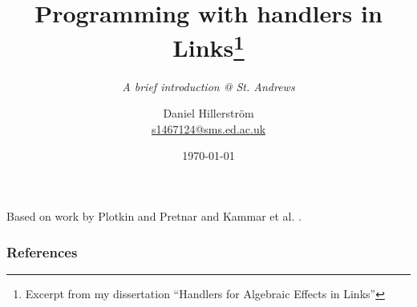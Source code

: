 \documentclass[10pt,compress]{beamer}
\author[Daniel Hillerström]{Daniel Hillerström\\\footnotesize{\href{mailto:s1467124@sms.ed.ac.uk}{s1467124@sms.ed.ac.uk}}}
\title[Programming with handlers in Links]{Programming with handlers in Links\footnote{Excerpt from my dissertation ``Handlers for Algebraic Effects in Links''}}
\subtitle{\textit{A brief introduction @ St. Andrews}}
\institute[University of Edinburgh]{School of Informatics\\The University of Edinburgh}
\date{\today}
\begin{document}
\begin{frame}[plain]
  \maketitle
\begin{center}
Based on work by Plotkin and Pretnar \cite{Plotkin2013} and Kammar et al. \cite{Kammar2013}.
\end{center}
\end{frame}



\begin{frame}
  \frametitle{References}
  
\end{frame}
\end{document}
